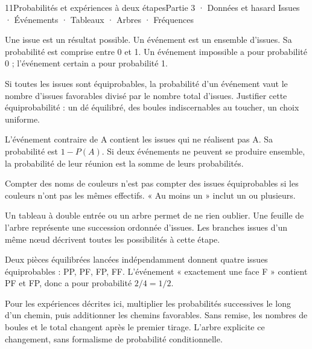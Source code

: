 \begin{ouverture}[probabilites]{11}{Probabilités et expériences à deux étapes}{Partie 3 · Données et hasard}
{Issues · Événements · Tableaux · Arbres · Fréquences}
\end{ouverture}
\pagestyle{otMain}\essentiel\fontsize{11}{15}\selectfont
{}
\begin{definition}Une issue est un résultat possible. Un événement est un ensemble d’issues. Sa probabilité est comprise entre 0 et 1. Un événement impossible a pour probabilité 0 ; l’événement certain a pour probabilité 1.\end{definition}
\begin{propriete}Si toutes les issues sont équiprobables, la probabilité d’un événement vaut le nombre d’issues favorables divisé par le nombre total d’issues. Justifier cette équiprobabilité : un dé équilibré, des boules indiscernables au toucher, un choix uniforme.\end{propriete}
\begin{propriete}L’événement contraire de A contient les issues qui ne réalisent pas A. Sa probabilité est $1-P(A)$. Si deux événements ne peuvent se produire ensemble, la probabilité de leur réunion est la somme de leurs probabilités.\end{propriete}
\begin{attention}Compter des noms de couleurs n’est pas compter des issues équiprobables si les couleurs n’ont pas les mêmes effectifs. « Au moins un » inclut un ou plusieurs.\end{attention}
\clearpage
{}
\begin{savoirfaire}[Énumérer]Un tableau à double entrée ou un arbre permet de ne rien oublier. Une feuille de l’arbre représente une succession ordonnée d’issues. Les branches issues d’un même nœud décrivent toutes les possibilités à cette étape.\end{savoirfaire}
\begin{exemple}Deux pièces équilibrées lancées indépendamment donnent quatre issues équiprobables : PP, PF, FP, FF. L’événement « exactement une face F » contient PF et FP, donc a pour probabilité $2/4=1/2$.\end{exemple}
\begin{savoirfaire}Pour les expériences décrites ici, multiplier les probabilités successives le long d’un chemin, puis additionner les chemins favorables. Sans remise, les nombres de boules et le total changent après le premier tirage. L’arbre explicite ce changement, sans formalisme de probabilité conditionnelle.\end{savoirfaire}
